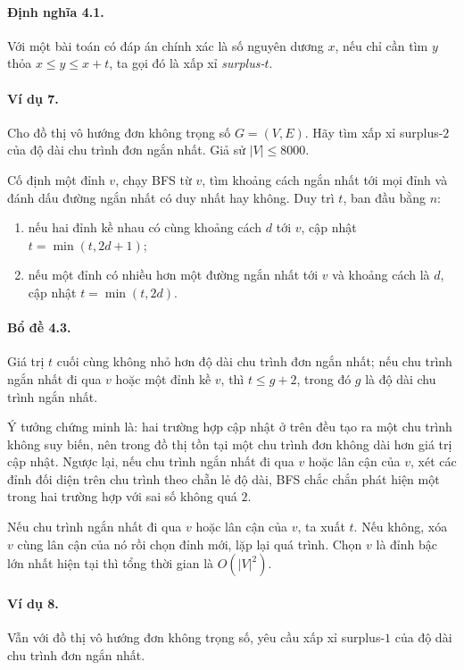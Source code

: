 \documentclass[11pt]{article}
\begin{document}
\paragraph{Định nghĩa 4.1.}
Với một bài toán có đáp án chính xác là số nguyên dương $x$, nếu chỉ cần tìm
$y$ thỏa $x\le y\le x+t$, ta gọi đó là xấp xỉ \emph{surplus-$t$}.

\paragraph{Ví dụ 7.}
Cho đồ thị vô hướng đơn không trọng số $G=(V,E)$. Hãy tìm xấp xỉ surplus-$2$
của độ dài chu trình đơn ngắn nhất. Giả sử $|V|\le8000$.

Cố định một đỉnh $v$, chạy BFS từ $v$, tìm khoảng cách ngắn nhất tới mọi đỉnh
và đánh dấu đường ngắn nhất có duy nhất hay không. Duy trì $t$, ban đầu bằng
$n$:
\begin{enumerate}
  \item nếu hai đỉnh kề nhau có cùng khoảng cách $d$ tới $v$, cập nhật
  $t=\min(t,2d+1)$;
  \item nếu một đỉnh có nhiều hơn một đường ngắn nhất tới $v$ và khoảng cách
  là $d$, cập nhật $t=\min(t,2d)$.
\end{enumerate}

\paragraph{Bổ đề 4.3.}
Giá trị $t$ cuối cùng không nhỏ hơn độ dài chu trình đơn ngắn nhất; nếu chu
trình ngắn nhất đi qua $v$ hoặc một đỉnh kề $v$, thì $t\le g+2$, trong đó $g$
là độ dài chu trình ngắn nhất.

Ý tưởng chứng minh là: hai trường hợp cập nhật ở trên đều tạo ra một chu trình
không suy biến, nên trong đồ thị tồn tại một chu trình đơn không dài hơn giá
trị cập nhật. Ngược lại, nếu chu trình ngắn nhất đi qua $v$ hoặc lân cận của
$v$, xét các đỉnh đối diện trên chu trình theo chẵn lẻ độ dài, BFS chắc chắn
phát hiện một trong hai trường hợp với sai số không quá $2$.

Nếu chu trình ngắn nhất đi qua $v$ hoặc lân cận của $v$, ta xuất $t$. Nếu
không, xóa $v$ cùng lân cận của nó rồi chọn đỉnh mới, lặp lại quá trình. Chọn
$v$ là đỉnh bậc lớn nhất hiện tại thì tổng thời gian là $O(|V|^2)$.

\paragraph{Ví dụ 8.}
Vẫn với đồ thị vô hướng đơn không trọng số, yêu cầu xấp xỉ surplus-$1$ của độ
dài chu trình đơn ngắn nhất.
\end{document}
